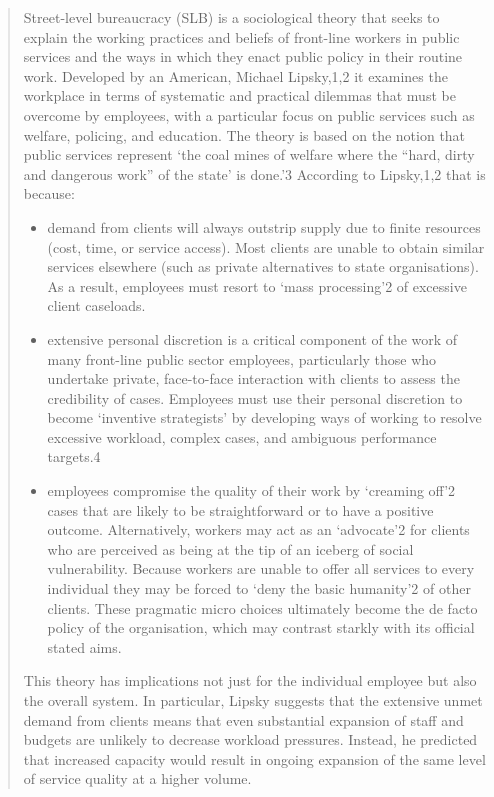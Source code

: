 \begin{quote}
Street-level bureaucracy (SLB) is a sociological theory that seeks to explain the working practices and beliefs of front-line workers in public services and the ways in which they enact public policy in their routine work. Developed by an American, Michael Lipsky,1,2 it examines the workplace in terms of systematic and practical dilemmas that must be overcome by employees, with a particular focus on public services such as welfare, policing, and education. The theory is based on the notion that public services represent ‘the coal mines of welfare where the “hard, dirty and dangerous work” of the state’ is done.’3 According to Lipsky,1,2 that is because:

\begin{itemize}
\item demand from clients will always outstrip supply due to finite resources (cost, time, or service access). Most clients are unable to obtain similar services elsewhere (such as private alternatives to state organisations). As a result, employees must resort to ‘mass processing’2 of excessive client caseloads.

\item extensive personal discretion is a critical component of the work of many front-line public sector employees, particularly those who undertake private, face-to-face interaction with clients to assess the credibility of cases. Employees must use their personal discretion to become ‘inventive strategists’ by developing ways of working to resolve excessive workload, complex cases, and ambiguous performance targets.4

    \item employees compromise the quality of their work by ‘creaming off’2 cases that are likely to be straightforward or to have a positive outcome. Alternatively, workers may act as an ‘advocate’2 for clients who are perceived as being at the tip of an iceberg of social vulnerability. Because workers are unable to offer all services to every individual they may be forced to ‘deny the basic humanity’2 of other clients. These pragmatic micro choices ultimately become the de facto policy of the organisation, which may contrast starkly with its official stated aims.
\end{itemize}
This theory has implications not just for the individual employee but also the overall system. In particular, Lipsky suggests that the extensive unmet demand from clients means that even substantial expansion of staff and budgets are unlikely to decrease workload pressures. Instead, he predicted that increased capacity would result in ongoing expansion of the same level of service quality at a higher volume.
\end{quote}


